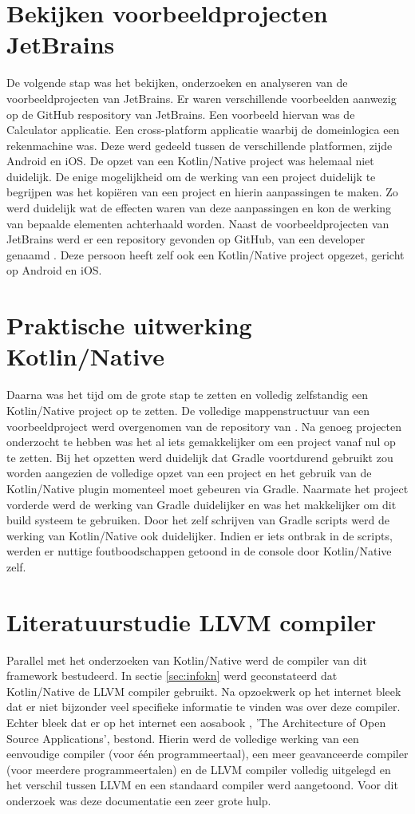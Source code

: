 \section{Bekijken voorbeeldprojecten JetBrains}
De volgende stap was het bekijken, onderzoeken en analyseren van de voorbeeldprojecten van JetBrains. Er waren verschillende voorbeelden aanwezig op de GitHub respository van JetBrains. Een voorbeeld hiervan was de Calculator applicatie. Een cross-platform applicatie waarbij de domeinlogica een rekenmachine was. Deze werd gedeeld tussen de verschillende platformen, zijde Android en iOS. De opzet van een Kotlin/Native project was helemaal niet duidelijk. De enige mogelijkheid om de werking van een project duidelijk te begrijpen was het kopiëren van een project en hierin aanpassingen te maken. Zo werd duidelijk wat de effecten waren van deze aanpassingen en kon de werking van bepaalde elementen achterhaald worden. Naast de voorbeeldprojecten van JetBrains werd er een repository gevonden op GitHub, van een developer genaamd \textcite{AlbertGao}. Deze persoon heeft zelf ook een Kotlin/Native project opgezet, gericht op Android en iOS.

\section{Praktische uitwerking Kotlin/Native}
Daarna was het tijd om de grote stap te zetten en volledig zelfstandig een Kotlin/Native project op te zetten. De volledige mappenstructuur van een voorbeeldproject werd overgenomen van de repository van \textcite{AlbertGao}. Na genoeg projecten onderzocht te hebben was het al iets gemakkelijker om een project vanaf nul op te zetten. Bij het opzetten werd duidelijk dat Gradle voortdurend gebruikt zou worden aangezien de volledige opzet van een project en het gebruik van de Kotlin/Native plugin momenteel moet gebeuren via Gradle. Naarmate het project vorderde werd de werking van Gradle duidelijker en was het makkelijker om dit build systeem te gebruiken. Door het zelf schrijven van Gradle scripts werd de werking van Kotlin/Native ook duidelijker. Indien er iets ontbrak in de scripts, werden er nuttige foutboodschappen getoond in de console door Kotlin/Native zelf.

\section{Literatuurstudie LLVM compiler}
Parallel met het onderzoeken van Kotlin/Native werd de compiler van dit framework bestudeerd. In sectie \ref{sec:infokn} werd geconstateerd dat Kotlin/Native de LLVM compiler gebruikt. Na opzoekwerk op het internet bleek dat er niet bijzonder veel specifieke informatie te vinden was over deze compiler. Echter bleek dat er op het internet een aosabook \autocite{aosa}, 'The Architecture of Open Source Applications', bestond. Hierin werd de volledige werking van een eenvoudige compiler (voor één programmeertaal), een meer geavanceerde compiler (voor meerdere programmeertalen) en de LLVM compiler volledig uitgelegd en het verschil tussen LLVM en een standaard compiler werd aangetoond. Voor dit onderzoek was deze documentatie een zeer grote hulp.

